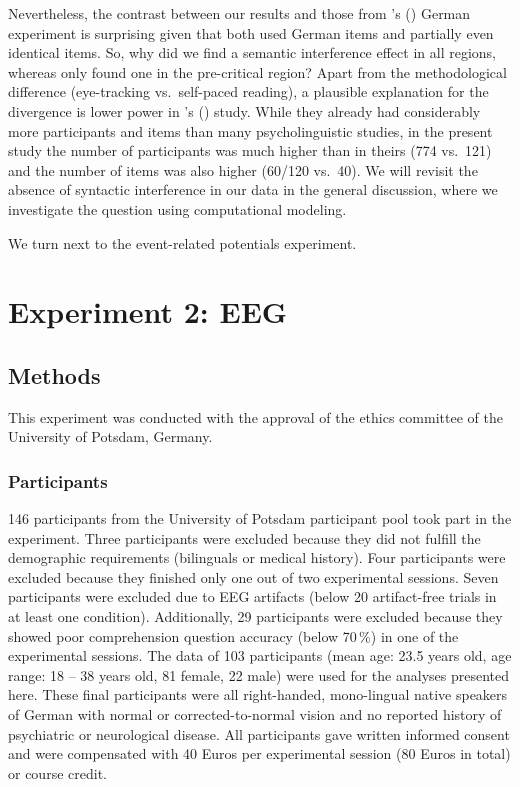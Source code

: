 \documentclass[a4paper, man, floatsintext]{apa7}
\begin{document}
Nevertheless, the contrast between our results and those from  \citeauthor{mertzen}'s (\citeyear{mertzen}) German experiment is surprising given that both used German items and partially even identical items. So, why did we find a semantic interference effect in all regions, whereas \citet{mertzen} only found one in the pre-critical region? Apart from the methodological difference (eye-tracking vs.\ self-paced reading), a plausible  explanation for the divergence is lower power in \citeauthor{mertzen}'s (\citeyear{mertzen}) study. While they already had considerably more participants and items than many psycholinguistic studies, in the present study the number of participants was much higher than in theirs (774 vs.\ 121) and the number of items was also higher (60/120 vs.\ 40). 
We will revisit the absence of syntactic interference in our data in the general discussion, where we investigate the question using computational modeling.

We turn next to the event-related potentials experiment.

\clearpage
\section{Experiment 2: EEG}
\subsection{Methods}
This experiment was conducted with the approval of the ethics committee of the University of Potsdam, Germany.

\subsubsection{Participants}
146 participants from the University of Potsdam participant pool took part in the experiment. Three participants were excluded because they did not fulfill the demographic requirements (bilinguals or medical history). Four participants were excluded because they finished only one out of two experimental sessions. Seven participants were excluded due to EEG artifacts (below 20 artifact-free trials in at least one condition). Additionally, 29 participants were excluded because they showed poor comprehension question accuracy (below 70\,\%) in one of the experimental sessions. The data of 103 participants (mean age: 23.5 years old, age range: 18 -- 38 years old, 81 female, 22 male) were used for the analyses presented here. These final participants were all right-handed, mono-lingual native speakers of German with normal or corrected-to-normal vision and no reported history of psychiatric or neurological disease. All participants gave written informed consent and were compensated with 40 Euros per experimental session (80 Euros in total) or course credit.
\end{document}

